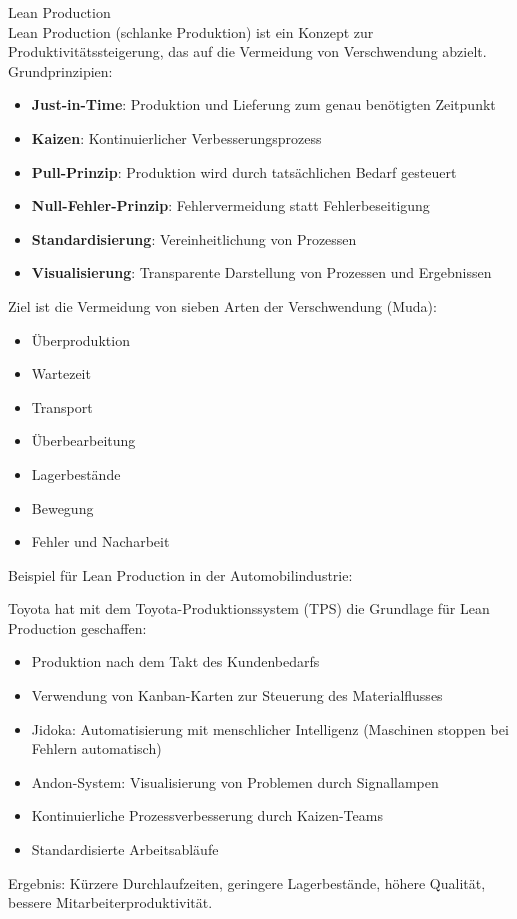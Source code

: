 \begin{concept}{Lean Production}\\
Lean Production (schlanke Produktion) ist ein Konzept zur Produktivitätssteigerung, das auf die Vermeidung von Verschwendung abzielt. Grundprinzipien:
\begin{itemize}
    \item \textbf{Just-in-Time}: Produktion und Lieferung zum genau benötigten Zeitpunkt
    \item \textbf{Kaizen}: Kontinuierlicher Verbesserungsprozess
    \item \textbf{Pull-Prinzip}: Produktion wird durch tatsächlichen Bedarf gesteuert
    \item \textbf{Null-Fehler-Prinzip}: Fehlervermeidung statt Fehlerbeseitigung
    \item \textbf{Standardisierung}: Vereinheitlichung von Prozessen
    \item \textbf{Visualisierung}: Transparente Darstellung von Prozessen und Ergebnissen
\end{itemize}

Ziel ist die Vermeidung von sieben Arten der Verschwendung (Muda):
\begin{itemize}
    \item Überproduktion
    \item Wartezeit
    \item Transport
    \item Überbearbeitung
    \item Lagerbestände
    \item Bewegung
    \item Fehler und Nacharbeit
\end{itemize}
\end{concept}

\begin{example}
Beispiel für Lean Production in der Automobilindustrie:

Toyota hat mit dem Toyota-Produktionssystem (TPS) die Grundlage für Lean Production geschaffen:
\begin{itemize}
    \item Produktion nach dem Takt des Kundenbedarfs
    \item Verwendung von Kanban-Karten zur Steuerung des Materialflusses
    \item Jidoka: Automatisierung mit menschlicher Intelligenz (Maschinen stoppen bei Fehlern automatisch)
    \item Andon-System: Visualisierung von Problemen durch Signallampen
    \item Kontinuierliche Prozessverbesserung durch Kaizen-Teams
    \item Standardisierte Arbeitsabläufe
\end{itemize}

Ergebnis: Kürzere Durchlaufzeiten, geringere Lagerbestände, höhere Qualität, bessere Mitarbeiterproduktivität.
\end{example}

